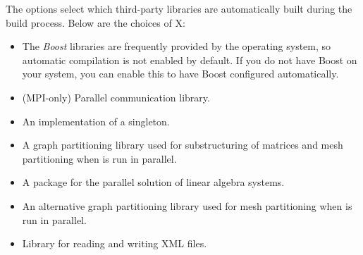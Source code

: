 The  options select which third-party libraries are
automatically built during the \nekpp build process. Below are the choices of X:
\begin{itemize}
    \item {}

    The \emph{Boost} libraries are frequently provided by the operating system,
    so automatic compilation is not enabled by default. If you do not have
    Boost on your system, you can enable this to have Boost configured
    automatically.

    \item {}

    (MPI-only) Parallel communication library.

    \item {}

    An implementation of a singleton.

    \item {}

    A graph partitioning library used for substructuring of matrices and mesh
    partitioning when \nekpp is run in parallel.

    \item {}

    A package for the parallel solution of linear algebra systems.

    \item {}

    An alternative graph partitioning library used for mesh partitioning when
    \nekpp is run in parallel.

    \item {}

    Library for reading and writing XML files.
\end{itemize}
